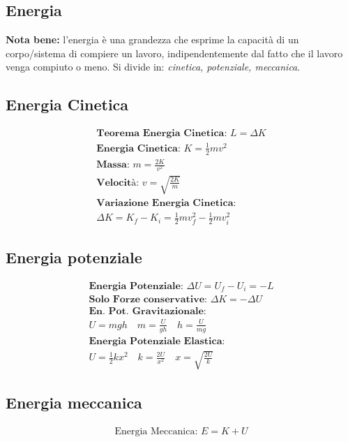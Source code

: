 \subsection{Energia}
\textbf{Nota bene: } l'energia è una grandezza che esprime la capacità di un corpo/sistema di compiere un lavoro, indipendentemente dal fatto che il lavoro venga compiuto o meno. Si divide in: \textit{cinetica, potenziale, meccanica}.

\subsection{Energia Cinetica}

\begin{gather*}
    \textbf{Teorema Energia Cinetica: } L = \Delta K \\
    \textbf{Energia Cinetica: } K = \frac{1}{2} m v^2 \\
    \textbf{Massa: } m = \frac{2K}{v^2} \\
    \textbf{Velocità: } v = \sqrt{\frac{2K}{m}} \\
    \textbf{Variazione Energia Cinetica: } \\ \Delta K = K_f - K_i = \frac{1}{2} m v_f^2 - \frac{1}{2} m v_i^2
\end{gather*}

\subsection{Energia potenziale}

\begin{gather*}
    \textbf{Energia Potenziale: } \Delta U = U_f - U_i = -L \\
    \textbf{Solo Forze conservative: } \Delta K = - \Delta U \\ 
    \textbf{En. Pot. Gravitazionale: } \\
        U = m g h \quad
        m = \frac{U}{gh} \quad
        h = \frac{U}{mg} \\
    \textbf{Energia Potenziale Elastica: } \\
        U = \frac{1}{2} k x^2 \quad
        k = \frac{2U}{x^2} \quad
        x = \sqrt{\frac{2U}{k}}
\end{gather*}

\subsection{Energia meccanica}

\begin{gather*}
    \text{Energia Meccanica: } E = K + U \\
\end{gather*}
